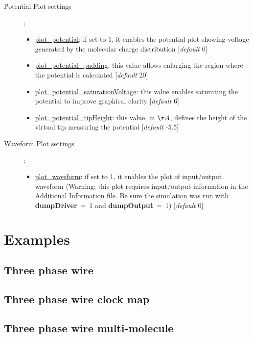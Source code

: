 \documentclass[a4paper,10pt]{article}
\begin{document}
\begin{description}
\item[Potential Plot settings]:
\begin{itemize}
	\item \underline{plot\_potential}: if set to 1, it enables the potential plot showing voltage generated by the molecular charge distribution [\textit{default} 0]
	\item \underline{plot\_potential\_padding}: this value allows enlarging the region where the potential is calculated [\textit{default} 20]
	\item \underline{plot\_potential\_saturationVoltage}: this value enables saturating the potential to improve graphical clarity [\textit{default} 6]
	\item \underline{plot\_potential\_tipHeight}: this value, in $\AA$, defines the height of the virtual tip measuring the potential [\textit{default} -5.5]
\end{itemize}

\item[Waveform Plot settings]:
\begin{itemize}
	\item \underline{plot\_waveform}: if set to 1, it enables the plot of input/output waveform (Warning: this plot requires input/output information in the Additional Information file. Be sure the simulation was run with \textbf{dumpDriver}~=~1 and \textbf{dumpOutput}~=~1) [\textit{default} 0]	
\end{itemize}


\end{description}

\section{Examples}
\subsection{Three phase wire}


\subsection{Three phase wire clock map}


\newpage
\subsection{Three phase wire multi-molecule}

\end{document}
